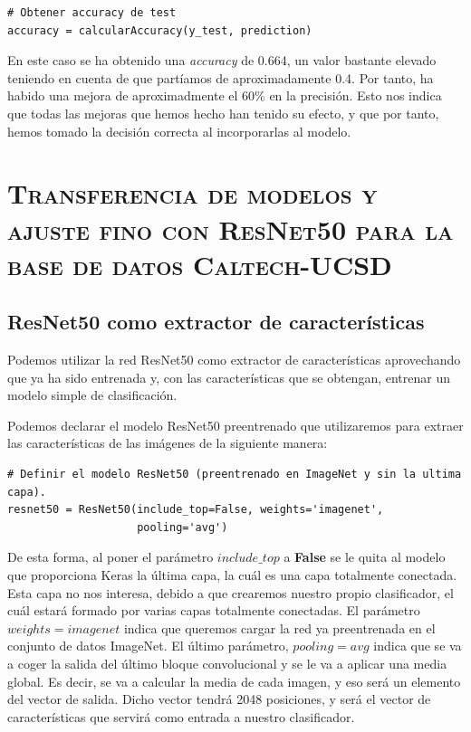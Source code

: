 \documentclass[11pt,a4paper]{article}
\begin{document}
\begin{lstlisting}
# Obtener accuracy de test
accuracy = calcularAccuracy(y_test, prediction)
\end{lstlisting}

En este caso se ha obtenido una \textit{accuracy} de 0.664, un valor bastante elevado teniendo en cuenta
de que partíamos de aproximadamente 0.4. Por tanto, ha habido una mejora de aproximadmente el 60\% en
la precisión. Esto nos indica que todas las mejoras que hemos hecho han tenido su efecto, y que por tanto,
hemos tomado la decisión correcta al incorporarlas al modelo.

\section{\textsc{Transferencia de modelos y ajuste fino con ResNet50 para la base de datos Caltech-UCSD}}

\subsection{ResNet50 como extractor de características}

Podemos utilizar la red ResNet50 como extractor de características aprovechando que ya ha sido
entrenada y, con las características que se obtengan, entrenar un modelo simple de clasificación.

Podemos declarar el modelo ResNet50 preentrenado que utilizaremos para extraer las características
de las imágenes de la siguiente manera:

\begin{lstlisting}
# Definir el modelo ResNet50 (preentrenado en ImageNet y sin la ultima capa).
resnet50 = ResNet50(include_top=False, weights='imagenet',
					pooling='avg')
\end{lstlisting}

De esta forma, al poner el parámetro $include\_top$ a \textbf{False} se le quita al modelo
que proporciona Keras la última capa, la cuál es una capa totalmente conectada. Esta capa no
nos interesa, debido a que crearemos nuestro propio clasificador, el cuál estará formado por
varias capas totalmente conectadas. El parámetro $weights = imagenet$
indica que queremos cargar la red ya preentrenada en el conjunto de datos ImageNet.
El último parámetro, $pooling = avg$ indica que se va a coger la salida del último bloque
convolucional y se le va a aplicar una media global. Es decir, se va a calcular
la media de cada imagen, y eso será un elemento del vector de salida. Dicho vector
tendrá 2048 posiciones, y será el vector de características que servirá como entrada
a nuestro clasificador.
\end{document}
